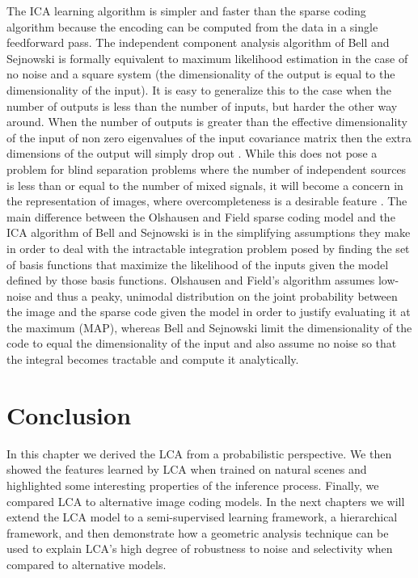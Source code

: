 The ICA learning algorithm is simpler and faster than the sparse coding algorithm because the encoding can be computed from the data in a single feedforward pass. The independent component analysis algorithm of Bell and Sejnowski \citeyearpar{bell1997independent} is formally equivalent to maximum likelihood estimation in the case of no noise and a square system (the dimensionality of the output is equal to the dimensionality of the input). It is easy to generalize this to the case when the number of outputs is less than the number of inputs, but harder the other way around. When the number of outputs is greater than the effective dimensionality of the input of non zero eigenvalues of the input covariance matrix then the extra dimensions of the output will simply drop out \parencite{livezey2016degeneracy, le2011ica}. While this does not pose a problem for blind separation problems where the number of independent sources is less than or equal to the number of mixed signals, it will become a concern in the representation of images, where overcompleteness is a desirable feature \parencite{simoncelli1991shiftable}. The main difference between the Olshausen and Field \citeyearpar{olshausen1996emergence} sparse coding model and the ICA algorithm of Bell and Sejnowski \citeyearpar{bell1997independent} is in the simplifying assumptions they make in order to deal with the intractable integration problem posed by finding the set of basis functions that maximize the likelihood of the inputs given the model defined by those basis functions. Olshausen and Field’s algorithm assumes low-noise and thus a peaky, unimodal distribution on the joint probability between the image and the sparse code given the model in order to justify evaluating it at the maximum (MAP), whereas Bell and Sejnowski limit the dimensionality of the code to equal the dimensionality of the input and also assume no noise so that the integral becomes tractable and compute it analytically.

\section{Conclusion}
In this chapter we derived the LCA from a probabilistic perspective. We then showed the features learned by LCA when trained on natural scenes and highlighted some interesting properties of the inference process. Finally, we compared LCA to alternative image coding models. In the next chapters we will extend the LCA model to a semi-supervised learning framework, a hierarchical framework, and then demonstrate how a geometric analysis technique can be used to explain LCA's high degree of robustness to noise and selectivity when compared to alternative models.
